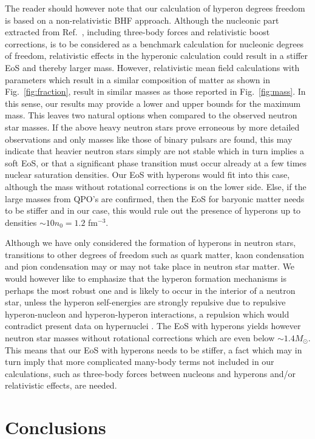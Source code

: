 The reader should however note that our calculation of hyperon
degrees freedom is based on a non-relativistic BHF 
approach. Although the nucleonic part extracted from Ref.\ \cite{apr98},
including three-body forces and relativistic boost corrections, is to be 
considered as a benchmark calculation for nucleonic degrees of freedom,
relativistic effects in the hyperonic calculation could result in a
stiffer EoS and thereby larger mass. However, relativistic mean 
field calculations
with parameters which result in a similar composition of matter as
shown in Fig.\ \ref{fig:fraction}, result in similar masses
as  those reported in Fig.\ \ref{fig:mass}.
In this sense, our results may provide a lower and upper bounds for the 
maximum mass. This  leaves two natural options
when compared to the observed neutron star masses.
If the above heavy neutron stars prove erroneous 
by more detailed observations
and only masses like those of binary pulsars are found, 
this may indicate that heavier neutron stars simply are not
stable which in turn implies a soft EoS, or that a
significant phase transition must occur already at a few times nuclear
saturation densities. Our EoS with hyperons would fit into this case, although
the mass without rotational corrections is on the lower side.
Else, if the large masses from QPO's are confirmed, then the EoS
for baryonic matter needs to be stiffer and in our case, this would
rule out the presence of hyperons up to densities 
$\sim 10n_0=1.2$ fm$^{-3}$. 


Although we have only considered the formation of hyperons in neutron
stars, transitions to other degrees of freedom such as quark matter,
kaon condensation and pion condensation may or may not take place
in neutron star matter.
We would however like to emphasize that the hyperon formation mechanisms
is perhaps the most robust one and is likely to occur in the interior
of a neutron star, unless the hyperon self-energies are strongly repulsive 
due
to repulsive hyperon-nucleon and hyperon-hyperon interactions, a repulsion
which  would contradict
present data on hypernuclei \cite{bando}.
The EoS with hyperons yields however neutron star masses without
rotational corrections which are even below $\sim 1.4M_\odot$.
This means that our EoS with hyperons needs to be stiffer, 
a fact which may in turn
imply that more complicated many-body terms not included in our 
calculations,
such as three-body forces between nucleons and hyperons and/or relativistic
effects,  are needed.

\section{Conclusions}
\label{sec:conclu}


